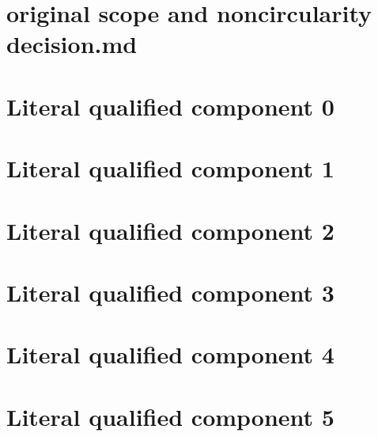 \documentclass[11pt]{article}
\begin{document}
\section{original scope and noncircularity decision.md}
\begin{ReviewBody}
\end{ReviewBody}

\appendix

\section{Literal qualified component 0}
\begin{GrantBody}

\end{GrantBody}

\section{Literal qualified component 1}
\begin{GrantBody}

\end{GrantBody}

\section{Literal qualified component 2}
\begin{GrantBody}

\end{GrantBody}

\section{Literal qualified component 3}
\begin{GrantBody}

\end{GrantBody}

\section{Literal qualified component 4}
\begin{GrantBody}

\end{GrantBody}

\section{Literal qualified component 5}
\begin{GrantBody}

\end{GrantBody}
\end{document}
